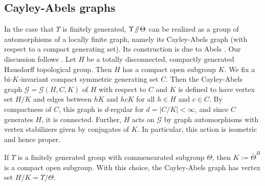\documentclass[JEP,XML,SOM,Unicode,published]{cedram}
\newcommand{\Y}{\ensuremath{\Upsilon}}
\newcommand{\sslash}{\mathbin{\mkern-3mu /\mkern-5mu/ \mkern-3mu}}
\newcommand{\calG}{\ensuremath{\mathcal{G}}}
\theoremstyle{definition}
\begin{document}
\subsection{Cayley-Abels graphs}\label{sec:ca-graphs}
In the case that $\Y$ is finitely generated, $\Y\sslash\Theta$ can be realized as a group of automorphisms of a locally finite graph, namely its Cayley-Abels graph (with respect to a compact generating set). Its construction is due to Abels \cite{abels-cayley}. Our discussion follows \cite[11.3]{monod-book}. Let $H$ be a totally disconnected, compactly generated Hausdorff topological group. Then $H$ has a compact open subgroup $K$. We fix a bi-$K$-invariant compact symmetric generating set $C$. Then the Cayley-Abels graph $\calG=\calG(H,C, K)$ of $H$ with respect to $C$ and $K$ is defined to have vertex set $H/K$ and edges between $hK$ and $hcK$ for all $h\in H$ and $c\in C$. By compactness of $C$, this graph is $d$-regular for $d=|C/K|<\infty$, and since $C$ generates $H$, it is connected. Further, $H$ acts on $\calG$ by graph automorphisms with vertex stabilizers given by conjugates of $K$. In particular, this action is isometric and hence proper.

If $\Y$ is a finitely generated group with commensurated subgroup $\Theta$, then $K:=\overline{\Theta}^H$ is a compact open subgroup. With this choice, the Cayley-Abels graph has vertex set $H/K=\Y/\Theta$.
\end{document}
